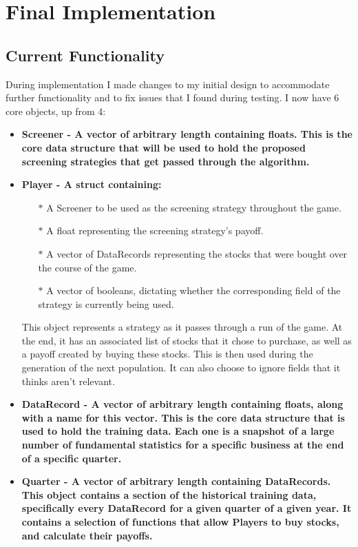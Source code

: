 \section{Final Implementation}
\subsection{Current Functionality}
During implementation I made changes to my initial design to accommodate further functionality and to fix issues that I found during testing. I now have 6 core objects, up from 4:
\begin{itemize}
    \item \bf Screener \rm - A vector of arbitrary length containing floats. This is the core data structure that will be used to hold the proposed screening strategies that get passed through the algorithm.
    \item \bf Player \rm - A struct containing:
    \begin{itemize}
        \item[$\ast$] A Screener to be used as the screening strategy throughout the game.
        \item[$\ast$] A float representing the screening strategy's payoff.
        \item[$\ast$] A vector of DataRecords representing the stocks that were bought over the course of the game.
        \item[$\ast$] A vector of booleans, dictating whether the corresponding field of the strategy is currently being used.
    \end{itemize}
    This object represents a strategy as it passes through a run of the game. At the end, it has an associated list of stocks that it chose to purchase, as well as a payoff created by buying these stocks. This is then used during the generation of the next population. It can also choose to ignore fields that it thinks aren't relevant.
    \item \bf DataRecord \rm - A vector of arbitrary length containing floats, along with a name for this vector. This is the core data structure that is used to hold the training data. Each one is a snapshot of a large number of fundamental statistics for a specific business at the end of a specific quarter.
    \item \bf Quarter \rm - A vector of arbitrary length containing DataRecords. This object contains a section of the historical training data, specifically every DataRecord for a given quarter of a given year. It contains a selection of functions that allow Players to buy stocks, and calculate their payoffs.

\end{itemize}
